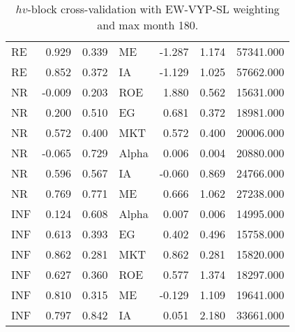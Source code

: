 \documentclass[12pt]{article}
\begin{document}
\begin{table}[ht]
\begin{tabular}{lrrlrrr}
RE & 0.929 & 0.339 & ME & -1.287 & 1.174 & 57341.000 \\ 
RE & 0.852 & 0.372 & IA & -1.129 & 1.025 & 57662.000 \\ 
\hline
NR & -0.009 & 0.203 & ROE & 1.880 & 0.562 & 15631.000 \\ 
NR & 0.200 & 0.510 & EG & 0.681 & 0.372 & 18981.000 \\ 
NR & 0.572 & 0.400 & MKT & 0.572 & 0.400 & 20006.000 \\ 
NR & -0.065 & 0.729 & Alpha & 0.006 & 0.004 & 20880.000 \\ 
NR & 0.596 & 0.567 & IA & -0.060 & 0.869 & 24766.000 \\ 
NR & 0.769 & 0.771 & ME & 0.666 & 1.062 & 27238.000 \\ 
\hline
INF & 0.124 & 0.608 & Alpha & 0.007 & 0.006 & 14995.000 \\ 
INF & 0.613 & 0.393 & EG & 0.402 & 0.496 & 15758.000 \\ 
INF & 0.862 & 0.281 & MKT & 0.862 & 0.281 & 15820.000 \\ 
INF & 0.627 & 0.360 & ROE & 0.577 & 1.374 & 18297.000 \\ 
INF & 0.810 & 0.315 & ME & -0.129 & 1.109 & 19641.000 \\ 
INF & 0.797 & 0.842 & IA & 0.051 & 2.180 & 33661.000 \\ 
		\hline
		\hline
	\end{tabular}
	\caption{$hv$-block cross-validation with EW-VYP-SL weighting and max month 180.} 
	\label{tab:cv_180_EW_VYP_SL}
\end{table}
\end{document}
